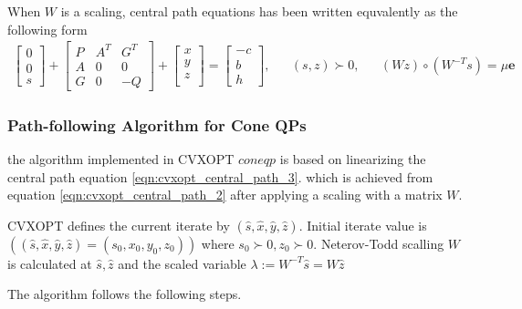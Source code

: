 When $W$ is a scaling, central path equations has been written equvalently as the following form
\begin{equation}
	\begin{aligned}
		\begin{bmatrix}
			0\\
			0\\
			s
		\end{bmatrix}
		+
		\begin{bmatrix}
			P & A^T & G^T\\
			A & 0 & 0\\
			G & 0 & -Q
		\end{bmatrix}
		+\begin{bmatrix}
			x\\
			y\\
			z\\
		\end{bmatrix}
		=
		\begin{bmatrix}
			-c\\
			b\\
			h
		\end{bmatrix}
		,
		& & (s,z)\succ 0, & & (Wz)\circ (W^{-T}s) = \mu \textbf{e}
	\end{aligned}
	\label{eqn:cvxopt_central_path_3}
\end{equation}

\subsubsection*{Path-following Algorithm for Cone QPs}

the algorithm implemented in CVXOPT $coneqp$ is based on linearizing the central path equation \ref{eqn:cvxopt_central_path_3}. which is achieved from equation \ref{eqn:cvxopt_central_path_2} after applying a scaling with a matrix $W$.

CVXOPT defines the current iterate by $(\hat{s},\hat{x},\hat{y},\hat{z})$. Initial iterate value is $((\hat{s},\hat{x},\hat{y},\hat{z})=(s_0,x_0,y_0,z_0))$ where $s_0\succ 0,z_0 \succ 0$. Neterov-Todd scalling $W$ is calculated at $\hat{s},\hat{z}$ and the scaled variable $\lambda := W^{-T}\hat{s} = W\hat{z}$

The algorithm follows the following steps.

